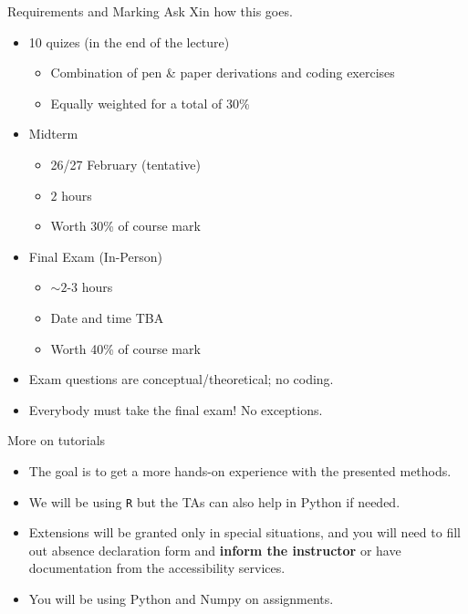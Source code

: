 \documentclass[11pt,handout,aspectratio=169]{beamer}
\begin{document}
\begin{frame}{Requirements and Marking}
Ask Xin how this goes.
\begin{itemize}
  \item 10 quizes (in the end of the lecture)
    \begin{itemize}
    \item Combination of pen \!\& \!paper derivations and coding exercises
    \item Equally weighted for a total of 30\%
    \end{itemize}
  \item Midterm
    \begin{itemize}
    \item 26/27 February (tentative)
    \item $2$ hours 
    \item Worth 30\% of course mark
    \end{itemize}
  \item Final Exam (In-Person)
    \begin{itemize}
    \item $\sim 2$-$3$ hours
    \item Date and time TBA
    \item Worth 40\% of course mark
    \end{itemize}
    \item Exam questions are  conceptual/theoretical; no coding.
    \item \alert{Everybody must take the final exam! No exceptions.}
  \end{itemize}
\end{frame}


\begin{frame}{More on tutorials}
  \begin{itemize}
  \item The goal is to get a more hands-on experience with the presented methods. 
  \item We will be using \texttt{R} but the TAs can also help in Python if needed.
  \item Extensions will be granted only in special situations, and you will need to fill out absence declaration form and \textbf{inform the instructor} or have documentation from the accessibility services.

  \item You will be using Python and Numpy on assignments.
  \end{itemize}\end{frame}
\end{document}
